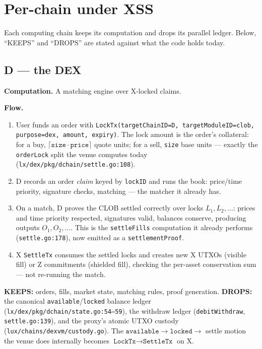 \section{Per-chain under XSS}
\label{sec:per-chain}

Each computing chain keeps its computation and drops its parallel
ledger. Below, ``KEEPS'' and ``DROPS'' are stated against what the code
holds today.

\subsection{D --- the DEX}

\textbf{Computation.} A matching engine over X-locked claims.

\textbf{Flow.}
\begin{enumerate}[leftmargin=2em,nosep]
\item User funds an order with \texttt{LockTx(targetChainID=D,
  targetModuleID=clob, purpose=dex, amount, expiry)}. The lock amount
  is the order's collateral: for a buy, $\lceil
  \texttt{size}\cdot\texttt{price}\rceil$ quote units; for a sell,
  \texttt{size} base units --- exactly the
  \texttt{orderLock} split the venue computes today
  (\texttt{lx/dex/pkg/dchain/settle.go:108}).
\item D records an order \emph{claim} keyed by \texttt{lockID} and runs
  the book: price/time priority, signature checks, matching --- the
  matcher it already has.
\item On a match, D proves the CLOB settled correctly over locks
  $L_1,L_2,\dots$: prices and time priority respected, signatures valid,
  balances conserve, producing outputs $O_1,O_2,\dots$. This is the
  \texttt{settleFills} computation it already performs
  (\texttt{settle.go:178}), now emitted as a \texttt{settlementProof}.
\item X \texttt{SettleTx} consumes the settled locks and creates new X
  UTXOs (visible fill) or Z commitments (shielded fill), checking the
  per-asset conservation sum --- not re-running the match.
\end{enumerate}

\textbf{KEEPS:} orders, fills, market state, matching rules, proof
generation. \textbf{DROPS:} the canonical \texttt{available}/\texttt{locked}
balance ledger (\texttt{lx/dex/pkg/dchain/state.go:54--59}), the
withdraw ledger (\texttt{debitWithdraw}, \texttt{settle.go:139}), and the
proxy's atomic UTXO custody (\texttt{lux/chains/dexvm/custody.go}). The
$\texttt{available}\to\texttt{locked}\to$ settle motion the venue does
internally becomes $\texttt{LockTx}\to\texttt{SettleTx}$ on X.

